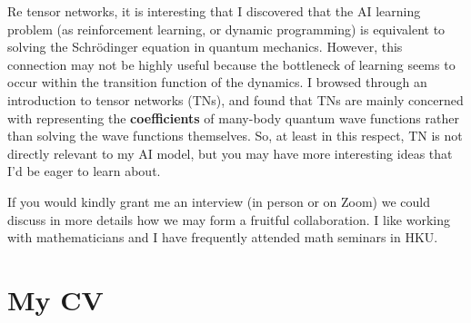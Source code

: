 Re tensor networks, it is interesting that I discovered that the AI learning problem (as reinforcement learning, or dynamic programming) is equivalent to solving the Schr\"{o}dinger equation in quantum mechanics.  However, this connection may not be highly useful because the bottleneck of learning seems to occur within the transition function of the dynamics.  I browsed through an introduction to tensor networks (TNs), and found that TNs are mainly concerned with representing the \textbf{coefficients} of many-body quantum wave functions rather than solving the wave functions themselves.  So, at least in this respect, TN is not directly relevant to my AI model, but you may have more interesting ideas that I'd be eager to learn about.

If you would kindly grant me an interview (in person or on Zoom) we could discuss in more details how we may form a fruitful collaboration.  I like working with mathematicians and I have frequently attended math seminars in HKU.

\section*{My CV}

